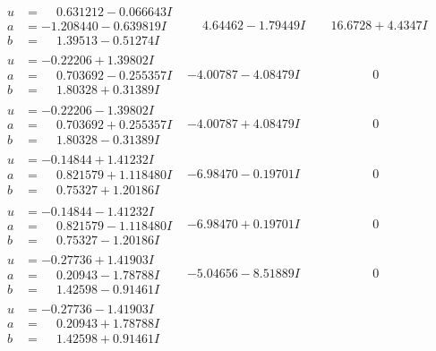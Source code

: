 \documentclass[1p]{elsarticle_modified}
\theoremstyle{definition}
\begin{document}
$$\begin{array}{c|c|c}
\begin{aligned}
u &= \phantom{-}0.631212 - 0.066643 I \\
a &= -1.208440 - 0.639819 I \\
b &= \phantom{-}1.39513 - 0.51274 I\end{aligned}
 & \phantom{-}4.64462 - 1.79449 I & \phantom{-}16.6728 + 4.4347 I \\ \hline\begin{aligned}
u &= -0.22206 + 1.39802 I \\
a &= \phantom{-}0.703692 - 0.255357 I \\
b &= \phantom{-}1.80328 + 0.31389 I\end{aligned}
 & -4.00787 - 4.08479 I & \phantom{-0.000000 } 0 \\ \hline\begin{aligned}
u &= -0.22206 - 1.39802 I \\
a &= \phantom{-}0.703692 + 0.255357 I \\
b &= \phantom{-}1.80328 - 0.31389 I\end{aligned}
 & -4.00787 + 4.08479 I & \phantom{-0.000000 } 0 \\ \hline\begin{aligned}
u &= -0.14844 + 1.41232 I \\
a &= \phantom{-}0.821579 + 1.118480 I \\
b &= \phantom{-}0.75327 + 1.20186 I\end{aligned}
 & -6.98470 - 0.19701 I & \phantom{-0.000000 } 0 \\ \hline\begin{aligned}
u &= -0.14844 - 1.41232 I \\
a &= \phantom{-}0.821579 - 1.118480 I \\
b &= \phantom{-}0.75327 - 1.20186 I\end{aligned}
 & -6.98470 + 0.19701 I & \phantom{-0.000000 } 0 \\ \hline\begin{aligned}
u &= -0.27736 + 1.41903 I \\
a &= \phantom{-}0.20943 - 1.78788 I \\
b &= \phantom{-}1.42598 - 0.91461 I\end{aligned}
 & -5.04656 - 8.51889 I & \phantom{-0.000000 } 0 \\ \hline\begin{aligned}
u &= -0.27736 - 1.41903 I \\
a &= \phantom{-}0.20943 + 1.78788 I \\
b &= \phantom{-}1.42598 + 0.91461 I\end{aligned}

\end{array}$$
\end{document}
